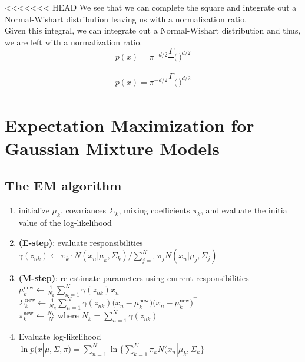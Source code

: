\documentclass{article}
\begin{document}
\noindent
<<<<<<< HEAD
We see that we can complete the square and integrate out a Normal-Wishart distribution leaving us with a normalization ratio.\\

Given this integral, we can integrate out a Normal-Wishart distribution and thus, we are left with a normalization ratio. \\

$$p(x) = \pi^{-d/2} \frac{\Gamma}{} \Bigg( \frac{}{} \Bigg )^{d/2}$$

$$p(x) = \pi^{-d/2} \frac{\Gamma}{} \Bigg( \frac{}{} \Bigg )^{d/2}$$



\newpage
\section{Expectation Maximization for Gaussian Mixture Models}

\subsection{The EM algorithm}
\begin{enumerate}
	\item initialize $\mu_k$, covariances $\Sigma_k$, mixing coefficients $\pi_k$, and evaluate the initia value of the log-likelihood
	\item \textbf{(E-step)}: evaluate responsibilities\\
$\gamma(z_{nk}) \leftarrow \pi_k \cdot N(x_n | \mu_k, \Sigma_k) / \displaystyle \sum_{j=1}^K \pi_j N(x_n | \mu_j, \Sigma_j)$ \\
		\item \textbf{(M-step)}: re-estimate parameters using current responsibilities\\
	$\mu_k^{\text{new}} \leftarrow \frac{1}{N_k} \displaystyle \sum_{n=1}^N \gamma(z_{nk}) x_n$ \\
$\Sigma_k^{\text{new}} \leftarrow \frac{1}{N_k} \displaystyle \sum_{n=1}^N \gamma(z_{nk}) \Big(x_n - \mu_k^\text{new}\Big)\Big(x_n - \mu_k^\text{new}\Big)^\top$ \\
$ \pi_k^\text{new} \leftarrow \frac{N_k}{N}$ where $N_k = \displaystyle \sum_{n=1}^N \gamma(z_{nk})$

\item Evaluate log-likelihood \\
$\ln p(x | \mu, \Sigma, \pi) = \displaystyle \sum_{n=1}^N  \ln \Big\{ \sum_{k=1}^K \pi_k N(x_n | \mu_k, \Sigma_k \Big\} $

\end{enumerate}
\end{document}
